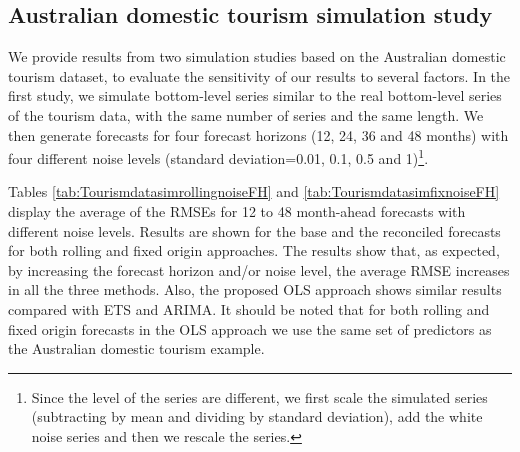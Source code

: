 \documentclass[11pt,a4paper,]{article}
\begin{document}
\hypertarget{australian-domestic-tourism-simulation-study}{%
\subsection{Australian domestic tourism simulation study}\label{australian-domestic-tourism-simulation-study}}

We provide results from two simulation studies based on the Australian domestic tourism dataset, to evaluate the sensitivity of our results to several factors. In the first study, we simulate bottom-level series similar to the real bottom-level series of the tourism data, with the same number of series and the same length. We then generate forecasts for four forecast horizons (12, 24, 36 and 48 months) with four different noise levels (standard deviation=0.01, 0.1, 0.5 and 1)\footnote{Since the level of the series are different, we first scale the simulated series (subtracting by mean and dividing by standard deviation), add the white noise series and then we rescale the series.}.

Tables \ref{tab:TourismdatasimrollingnoiseFH} and \ref{tab:TourismdatasimfixnoiseFH} display the average of the RMSEs for 12 to 48 month-ahead forecasts with different noise levels. Results are shown for the base and the reconciled forecasts for both rolling and fixed origin approaches. The results show that, as expected, by increasing the forecast horizon and/or noise level, the average RMSE increases in all the three methods. Also, the proposed OLS approach shows similar results compared with ETS and ARIMA. It should be noted that for both rolling and fixed origin forecasts in the OLS approach we use the same set of predictors as the Australian domestic tourism example.
\end{document}
